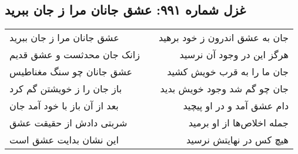 \begin{center}
\section*{غزل شماره ۹۹۱: عشق جانان مرا ز جان ببرید}
\label{sec:0991}
\begin{longtable}{l p{0.5cm} r}
عشق جانان مرا ز جان ببرید
&&
جان به عشق اندرون ز خود برهید
\\
زانک جان محدثست و عشق قدیم
&&
هرگز این در وجود آن نرسید
\\
عشق جانان چو سنگ مغناطیس
&&
جان ما را به قرب خویش کشید
\\
باز جان را ز خویشتن گم کرد
&&
جان چو گم شد وجود خویش بدید
\\
بعد از آن باز با خود آمد جان
&&
دام عشق آمد و در او پیچید
\\
شربتی دادش از حقیقت عشق
&&
جمله اخلاص‌ها از او برمید
\\
این نشان بدایت عشق است
&&
هیچ کس در نهایتش نرسید
\\
\end{longtable}
\end{center}

